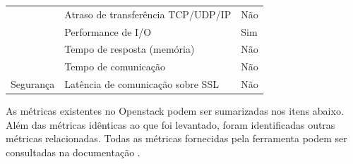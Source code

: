 \documentclass[conference]{IEEEtran}
\begin{document}
\begin{table}[ht]
\begin{tabular}{@{}lll@{}}
                                       & Atraso de transferência TCP/UDP/IP                                                    & Não                                           \\
                                       & Performance de I/O                                                                    & Sim                                           \\
                                       & Tempo de resposta (memória)                                                           & Não                                           \\
                                       & Tempo de comunicação                                                                  & Não                                           \\
Segurança                              & Latência de comunicação sobre SSL                                                     & Não                                           \\ \bottomrule
\end{tabular}
\end{table}  

As métricas existentes no Openstack podem ser sumarizadas nos itens abaixo.
Além das métricas idênticas ao que foi levantado, foram identificadas outras
métricas relacionadas. Todas as métricas fornecidas pela ferramenta podem ser consultadas na documentação \cite{openstack}.
\end{document}

